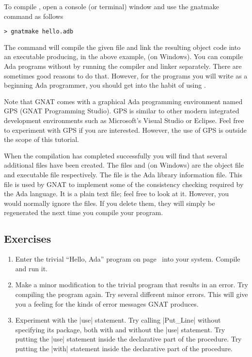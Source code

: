 To compile , open a console (or terminal) window and use the gnatmake
command as follows

\begin{Verbatim}
> gnatmake hello.adb
\end{Verbatim}

\noindent The  command will compile the given file and link the resulting
object code into an executable producing, in the above example,  (on
Windows). You can compile Ada programs without  by running the compiler and
linker separately. There are sometimes good reasons to do that. However, for the programs you
will write as a beginning Ada programmer, you should get into the habit of using
.

Note that GNAT comes with a graphical Ada programming environment named GPS (GNAT Programming
Studio). GPS is similar to other modern integrated development environments such as Microsoft's
Visual Studio or Eclipse. Feel free to experiment with GPS if you are interested. However, the
use of GPS is outside the scope of this tutorial.

When the compilation has completed successfully you will find that several additional files have
been created. The files  and  (on Windows) are the object
file and executable file respectively. The file  is the Ada library
information file. This file is used by GNAT to implement some of the consistency checking
required by the Ada language. It is a plain text file; feel free to look at it. However, you
would normally ignore the  files. If you delete them, they will simply be
regenerated the next time you compile your program.

\subsection*{Exercises}

\begin{enumerate}
\item Enter the trivial ``Hello, Ada'' program on page~\pageref{lst:hello-ada} into your system.
  Compile and run it.

\item Make a minor modification to the trivial program that results in an error. Try compiling
  the program again. Try several different minor errors. This will give you a feeling for the
  kinds of error messages GNAT produces.

\item Experiment with the |use| statement. Try calling |Put_Line| without specifying its
  package, both with and without the |use| statement. Try putting the |use| statement inside the
  declarative part of the procedure. Try putting the |with| statement inside the declarative
  part of the procedure.
\end{enumerate}

